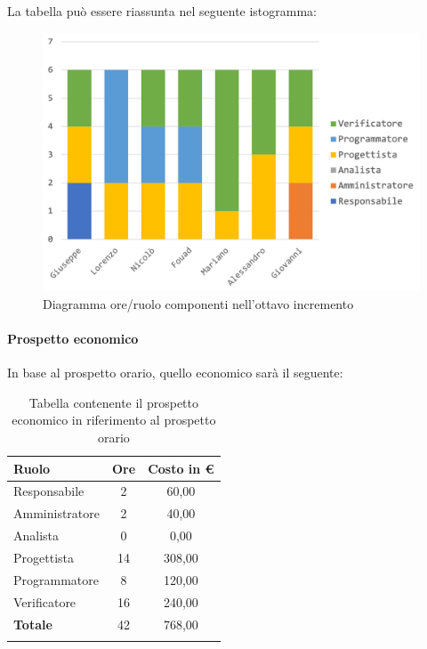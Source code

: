 			La tabella può essere riassunta nel seguente istogramma:
			\begin{figure}[H]
				\centering
				\includegraphics[width=0.8\linewidth]{./images/preventivo/incremento8-1.png}
				\caption{Diagramma ore/ruolo componenti nell'ottavo incremento}
				\label{fig:diagramma suddivione ruoli incremento VIII}
			\end{figure}
			\pagebreak
			
			\paragraph{Prospetto economico}
			In base al prospetto orario, quello economico sarà il seguente: 
			
			\begin{longtable}{|l|c|c|}
				\hline
				\rowcolor{lighter-grayer}
				\textbf{Ruolo} & \textbf{Ore} & \textbf{Costo in € } \\
				\hline
				\endfirsthead
				
				\hline
				Responsabile 	    & 2 & 60,00\\
				\hline 
				\hline
				Amministratore	   & 2 & 40,00\\
				\hline
				\hline
				Analista 				& 0 & 0,00\\
				\hline
				\hline
				Progettista 		   & 14 & 308,00\\
				\hline
				\hline
				Programmatore 	  & 8 & 120,00\\
				\hline
				\hline
				Verificatore 		   & 16 & 240,00\\
				\hline
				\textbf{Totale} 	 & 42 & 768,00\\
				\hline
				\caption{Tabella contenente il prospetto economico in riferimento al prospetto orario}
			\end{longtable}
			
